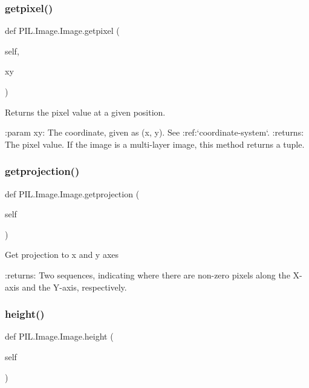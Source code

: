 \subsubsection{\texorpdfstring{getpixel()}{getpixel()}}
{\footnotesize\ttfamily def P\+I\+L.\+Image.\+Image.\+getpixel (\begin{DoxyParamCaption}\item[{}]{self,  }\item[{}]{xy }\end{DoxyParamCaption})}

\begin{DoxyVerb}Returns the pixel value at a given position.

:param xy: The coordinate, given as (x, y). See
   :ref:`coordinate-system`.
:returns: The pixel value.  If the image is a multi-layer image,
   this method returns a tuple.
\end{DoxyVerb}
 \mbox{\label{classPIL_1_1Image_1_1Image_ab56365cd15a36d786cfe5fc76fb5b69b}} 
\subsubsection{\texorpdfstring{getprojection()}{getprojection()}}
{\footnotesize\ttfamily def P\+I\+L.\+Image.\+Image.\+getprojection (\begin{DoxyParamCaption}\item[{}]{self }\end{DoxyParamCaption})}

\begin{DoxyVerb}Get projection to x and y axes

:returns: Two sequences, indicating where there are non-zero
    pixels along the X-axis and the Y-axis, respectively.
\end{DoxyVerb}
 \mbox{\label{classPIL_1_1Image_1_1Image_ae94a49c83ae90fd02e41aa5fe4a2752b}} 
\subsubsection{\texorpdfstring{height()}{height()}}
{\footnotesize\ttfamily def P\+I\+L.\+Image.\+Image.\+height (\begin{DoxyParamCaption}\item[{}]{self }\end{DoxyParamCaption})}

